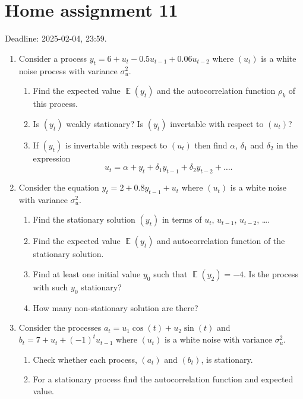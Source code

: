 \documentclass[12pt]{article}
\DeclareMathOperator{\E}{\mathbb{E}}
\begin{document}

\section*{Home assignment 11}

Deadline: 2025-02-04, 23:59.

\begin{enumerate}

\item Consider a process $y_t = 6 + u_t - 0.5 u_{t-1} + 0.06 u_{t-2}$ where $(u_t)$ is a white noise process with variance $\sigma^2_u$.
\begin{enumerate}
    \item Find the expected value $\E(y_t)$ and the autocorrelation function $\rho_k$ of this process. 
    \item Is $(y_t)$ weakly stationary? Is $(y_t)$ invertable with respect to $(u_t)$?
    \item If $(y_t)$ is invertable with respect to $(u_t)$ then find $\alpha$, $\delta_1$ and $\delta_2$ in the expression 
    \[
    u_t = \alpha  + y_t + \delta_1 y_{t-1} + \delta_2 y_{t-2} + \dots. 
    \]
\end{enumerate}
    
\item Consider the equation $y_t = 2 + 0.8 y_{t-1} + u_t$ where $(u_t)$ is a white noise with variance $\sigma^2_u$.
    \begin{enumerate}
        \item Find the stationary solution $(y_t)$ in terms of $u_t$, $u_{t-1}$, $u_{t-2}$, \dots. 
        \item Find the expected value $\E(y_t)$ and autocorrelation function of the stationary solution. 
        \item Find at least one initial value $y_0$ such that $\E(y_2) = -4$. Is the process with such $y_0$ stationary?
        \item How many non-stationary solution are there?
    \end{enumerate}

    \item Consider the processes $a_t = u_1 \cos(t) + u_2 \sin (t)$ and $b_t = 7 + u_t + (-1)^t u_{t-1}$ 
    where $(u_t)$ is a white noise with variance $\sigma^2_u$.

    \begin{enumerate}
        \item Check whether each process, $(a_t)$ and $(b_t)$, is stationary. 
        \item For a stationary process find the autocorrelation function and expected value. 
    \end{enumerate}




\end{enumerate}
\end{document}
